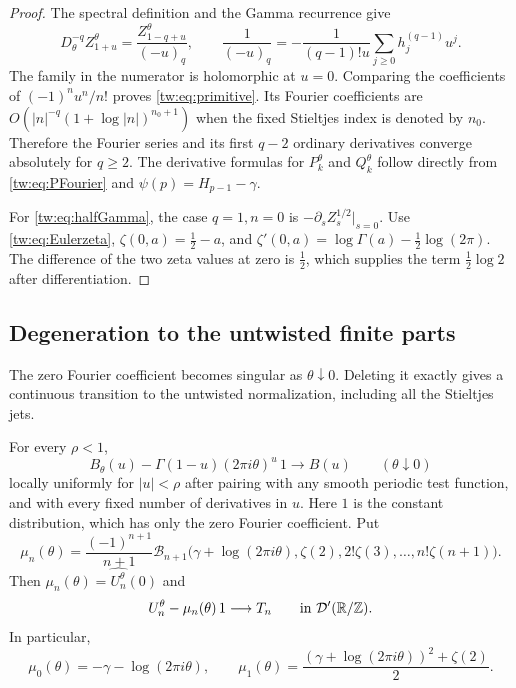 \begin{proof}
The spectral definition and the Gamma recurrence give
\[
 D_\theta^{-q}Z_{1+u}^\theta
       =\frac{Z_{1-q+u}^\theta}{(-u)_q},\qquad
 \frac1{(-u)_q}
       =-\frac1{(q-1)!u}\sum_{j\ge0}h_j^{(q-1)}u^j.
\]
The family in the numerator is holomorphic at $u=0$. Comparing
the coefficients of $(-1)^nu^n/n!$ proves
\eqref{tw:eq:primitive}. Its Fourier coefficients are
$O(|n|^{-q}(1+\log|n|)^{n_0+1})$ when the fixed Stieltjes
index is denoted by $n_0$. Therefore the Fourier series and its
first $q-2$ ordinary derivatives converge absolutely for $q\ge2$.
The derivative formulas for $P_k^\theta$ and $Q_k^\theta$ follow
directly from \eqref{tw:eq:PFourier} and
$\psi(p)=H_{p-1}-\gamma$.

For \eqref{tw:eq:halfGamma}, the case $q=1,n=0$ is
$-\partial_s Z_s^{1/2}|_{s=0}$. Use
\eqref{tw:eq:Eulerzeta}, $\zeta(0,a)=\tfrac12-a$, and
$\zeta'(0,a)=\log\Gamma(a)-\tfrac12\log(2\pi)$.
The difference of the two zeta values at zero is $\tfrac12$,
which supplies the term $\tfrac12\log2$ after differentiation.
\end{proof}

\subsection{Degeneration to the untwisted finite parts}

The zero Fourier coefficient becomes singular as $\theta\downarrow0$.
Deleting it exactly gives a continuous transition to the untwisted
normalization, including all the Stieltjes jets.

\begin{theorem}
\label{tw:thm:zerolimit}
For every $\rho<1$,
\begin{equation}\label{tw:eq:Blimit}
 B_\theta(u)-\Gamma(1-u)(2\pi i\theta)^u\,1
                    \longrightarrow B(u)
 \qquad (\theta\downarrow0)
\end{equation}
locally uniformly for $|u|<\rho$ after pairing with any smooth
periodic test function, and with every fixed number of derivatives
in $u$. Here $1$ is the constant distribution, which has only the
zero Fourier coefficient. Put
\begin{equation}\label{tw:eq:meanjet}
 \mu_n(\theta)=\frac{(-1)^{n+1}}{n+1}
 \mathcal B_{n+1}\bigl(
    \gamma+\log(2\pi i\theta),\zeta(2),2!\zeta(3),
                              \ldots,n!\zeta(n+1)\bigr).
\end{equation}
Then $\mu_n(\theta)=\widehat{U_n^\theta}(0)$ and
\begin{equation}\label{tw:eq:Ulimit}
 U_n^\theta-\mu_n(\theta)\,1\longrightarrow T_n
                \qquad\hbox{in }\mathcal D'(\mathbb R/\mathbb Z).
\end{equation}
In particular,
\[
 \mu_0(\theta)=-\gamma-\log(2\pi i\theta),\qquad
 \mu_1(\theta)=\frac{(\gamma+\log(2\pi i\theta))^2+\zeta(2)}2.
\]
\end{theorem}

